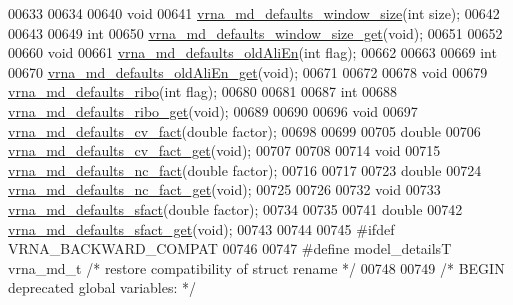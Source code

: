 \begin{DoxyCode}
00633 
00634 
00640 \textcolor{keywordtype}{void}
00641 \hyperlink{group__model__details_ga7b802ce0e8c3181bf5cb580de6d5b26a}{vrna\_md\_defaults\_window\_size}(\textcolor{keywordtype}{int} size);
00642 
00643 
00649 \textcolor{keywordtype}{int}
00650 \hyperlink{group__model__details_ga670146a9aa3ba77f4d422d60b7c30ac9}{vrna\_md\_defaults\_window\_size\_get}(\textcolor{keywordtype}{void});
00651 
00652 
00660 \textcolor{keywordtype}{void}
00661 \hyperlink{group__model__details_ga41521d5b9fb7e0f31e7ea73f5792afab}{vrna\_md\_defaults\_oldAliEn}(\textcolor{keywordtype}{int} flag);
00662 
00663 
00669 \textcolor{keywordtype}{int}
00670 \hyperlink{group__model__details_ga2374492b5019df88022fe4c05f0f3630}{vrna\_md\_defaults\_oldAliEn\_get}(\textcolor{keywordtype}{void});
00671 
00672 
00678 \textcolor{keywordtype}{void}
00679 \hyperlink{group__model__details_ga937c45e1d06fd6168730a9b08d130be3}{vrna\_md\_defaults\_ribo}(\textcolor{keywordtype}{int} flag);
00680 
00681 
00687 \textcolor{keywordtype}{int}
00688 \hyperlink{group__model__details_ga169027f0c0561ea7d87b655e4b336bfc}{vrna\_md\_defaults\_ribo\_get}(\textcolor{keywordtype}{void});
00689 
00690 
00696 \textcolor{keywordtype}{void}
00697 \hyperlink{group__model__details_gad3a3f40baafd91a6ce80a91a68e20053}{vrna\_md\_defaults\_cv\_fact}(\textcolor{keywordtype}{double} factor);
00698 
00699 
00705 \textcolor{keywordtype}{double}
00706 \hyperlink{group__model__details_gae59c68393807217b0a2497adb64d3ee3}{vrna\_md\_defaults\_cv\_fact\_get}(\textcolor{keywordtype}{void});
00707 
00708 
00714 \textcolor{keywordtype}{void}
00715 \hyperlink{group__model__details_gac35e596c850dce3ad55c49119fd7d471}{vrna\_md\_defaults\_nc\_fact}(\textcolor{keywordtype}{double} factor);
00716 
00717 
00723 \textcolor{keywordtype}{double}
00724 \hyperlink{group__model__details_ga7ac759eaa7159bf5f022745f5da59508}{vrna\_md\_defaults\_nc\_fact\_get}(\textcolor{keywordtype}{void});
00725 
00726 
00732 \textcolor{keywordtype}{void}
00733 \hyperlink{group__model__details_ga3f73d3029d3d0025d4cc311510cd95a3}{vrna\_md\_defaults\_sfact}(\textcolor{keywordtype}{double} factor);
00734 
00735 
00741 \textcolor{keywordtype}{double}
00742 \hyperlink{group__model__details_gab2df6aab954b63fd3592d18e90285dae}{vrna\_md\_defaults\_sfact\_get}(\textcolor{keywordtype}{void});
00743 
00744 
00745 \textcolor{preprocessor}{#ifdef  VRNA\_BACKWARD\_COMPAT}
00746 
00747 \textcolor{preprocessor}{#define model\_detailsT        vrna\_md\_t               }\textcolor{comment}{/* restore compatibility of struct rename */}\textcolor{preprocessor}{}
00748 
00749 \textcolor{comment}{/* BEGIN deprecated global variables: */}

\end{DoxyCode}

